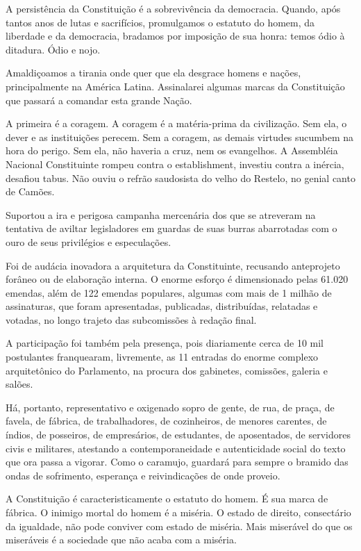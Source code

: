 A persistência da Constituição é a sobrevivência da democracia. Quando,
após tantos anos de lutas e sacrifícios, promulgamos o estatuto do
homem, da liberdade e da democracia, bradamos por imposição de sua
honra: temos ódio à ditadura. Ódio e nojo.

Amaldiçoamos a tirania onde quer que ela desgrace homens e nações,
principalmente na América Latina. Assinalarei algumas marcas da
Constituição que passará a comandar esta grande Nação.

A primeira é a coragem. A coragem é a matéria-prima da civilização. Sem
ela, o dever e as instituições perecem. Sem a coragem, as demais
virtudes sucumbem na hora do perigo. Sem ela, não haveria a cruz, nem os
evangelhos. A Assembléia Nacional Constituinte rompeu contra o
establishment, investiu contra a inércia, desafiou tabus. Não ouviu o
refrão saudosista do velho do Restelo, no genial canto de Camões.

Suportou a ira e perigosa campanha mercenária dos que se atreveram na
tentativa de aviltar legisladores em guardas de suas burras abarrotadas
com o ouro de seus privilégios e especulações.

Foi de audácia inovadora a arquitetura da Constituinte, recusando
anteprojeto forâneo ou de elaboração interna. O enorme esforço é
dimensionado pelas 61.020 emendas, além de 122 emendas populares,
algumas com mais de 1 milhão de assinaturas, que foram apresentadas,
publicadas, distribuídas, relatadas e votadas, no longo trajeto das
subcomissões à redação final.

A participação foi também pela presença, pois diariamente cerca de 10
mil postulantes franquearam, livremente, as 11 entradas do enorme
complexo arquitetônico do Parlamento, na procura dos gabinetes,
comissões, galeria e salões.

Há, portanto, representativo e oxigenado sopro de gente, de rua, de
praça, de favela, de fábrica, de trabalhadores, de cozinheiros, de
menores carentes, de índios, de posseiros, de empresários, de
estudantes, de aposentados, de servidores civis e militares, atestando a
contemporaneidade e autenticidade social do texto que ora passa a
vigorar. Como o caramujo, guardará para sempre o bramido das ondas de
sofrimento, esperança e reivindicações de onde proveio.

A Constituição é caracteristicamente o estatuto do homem. É sua marca de
fábrica. O inimigo mortal do homem é a miséria. O estado de direito,
consectário da igualdade, não pode conviver com estado de miséria. Mais
miserável do que os miseráveis é a sociedade que não acaba com a
miséria.

